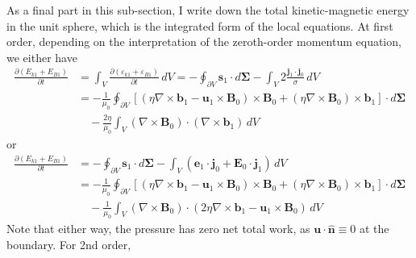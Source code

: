 As a final part in this sub-section, I write down the total kinetic-magnetic energy in the unit sphere, which is the integrated form of the local equations. At first order, depending on the interpretation of the zeroth-order momentum equation, we either have
%
\begin{equation}
\begin{aligned}
    \frac{\partial (E_{k1} + E_{B1})}{\partial t} &= \int_V \frac{\partial (\varepsilon_{k1} + \varepsilon_{B1})}{\partial t} \, dV = - \oint_{\partial V} \mathbf{s}_1\cdot d\boldsymbol{\Sigma} - \int_V 2 \frac{\mathbf{j}_1\cdot \mathbf{j}_0}{\sigma}\, dV \\ 
    &= - \frac{1}{\mu_0} \oint_{\partial V} \left[(\eta \nabla\times \mathbf{b}_1 - \mathbf{u}_1\times\mathbf{B}_0)\times \mathbf{B}_0 + (\eta\nabla\times \mathbf{B}_0) \times \mathbf{b}_1\right]\cdot d\boldsymbol{\Sigma} \\
    &\quad - \frac{2\eta}{\mu_0} \int_V (\nabla\times \mathbf{B}_0)\cdot (\nabla\times \mathbf{b}_1) \, dV
\end{aligned}
\end{equation}
%
or 
%
\begin{equation}\label{eqn:energy-order1-noflow}
    \begin{aligned}
        \frac{\partial (E_{k1} + E_{B1})}{\partial t} &= - \oint_{\partial V} \mathbf{s}_1\cdot d\boldsymbol{\Sigma} - \int_V (\mathbf{e}_1\cdot \mathbf{j}_0 + \mathbf{E}_0\cdot \mathbf{j}_1)\, dV \\ 
        &= - \frac{1}{\mu_0} \oint_{\partial V} \left[(\eta \nabla\times \mathbf{b}_1 - \mathbf{u}_1\times\mathbf{B}_0)\times \mathbf{B}_0 + (\eta\nabla\times \mathbf{B}_0) \times \mathbf{b}_1\right]\cdot d\boldsymbol{\Sigma} \\
        &\quad - \frac{1}{\mu_0} \int_V (\nabla\times \mathbf{B}_0)\cdot (2\eta\nabla\times \mathbf{b}_1 - \mathbf{u}_1\times \mathbf{B}_0)\, dV
    \end{aligned}
\end{equation}
%
Note that either way, the pressure has zero net total work, as $\mathbf{u}\cdot \hat{\mathbf{n}}\equiv 0$ at the boundary. For 2nd order,
%
